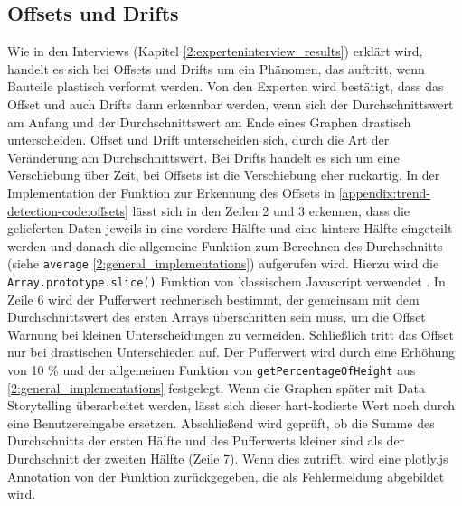 \subsection{Offsets und Drifts}
Wie in den Interviews (Kapitel \ref{2:experteninterview_results}) erklärt wird, handelt es sich bei Offsets und Drifts um ein Phänomen, das auftritt, wenn Bauteile plastisch verformt werden. Von den Experten wird bestätigt, dass das Offset und auch Drifts dann erkennbar werden, wenn sich der Durchschnittswert am Anfang und der Durchschnittswert am Ende eines Graphen drastisch unterscheiden. Offset und Drift unterscheiden sich, durch die Art der Veränderung am Durchschnittswert. Bei Drifts handelt es sich um eine Verschiebung über Zeit, bei Offsets ist die Verschiebung eher ruckartig. In der Implementation der Funktion zur Erkennung des Offsets in \ref{appendix:trend-detection-code:offsets} lässt sich in den Zeilen 2 und 3 erkennen, dass die gelieferten Daten jeweils in eine vordere Hälfte und eine hintere Hälfte eingeteilt werden und danach die allgemeine Funktion zum Berechnen des Durchschnitts (siehe \texttt{average} \ref{2:general_implementations}) aufgerufen wird. Hierzu wird die \texttt{Array.prototype.slice()} Funktion von klassischem Javascript verwendet \cite{MDNcontributors.2020}. In Zeile 6 wird der Pufferwert rechnerisch bestimmt, der gemeinsam mit dem Durchschnittswert des ersten Arrays überschritten  sein muss, um die Offset Warnung bei kleinen Unterscheidungen zu vermeiden. Schließlich tritt das Offset nur bei drastischen Unterschieden auf. Der Pufferwert wird durch eine Erhöhung von 10 \% und der allgemeinen Funktion von \texttt{getPercentageOfHeight} aus \ref{2:general_implementations} festgelegt. Wenn die Graphen später mit Data Storytelling überarbeitet werden, lässt sich dieser hart-kodierte Wert noch durch eine Benutzereingabe ersetzen. Abschließend wird geprüft, ob die Summe des Durchschnitts der ersten Hälfte und des Pufferwerts kleiner sind als der Durchschnitt der zweiten Hälfte (Zeile 7). Wenn dies zutrifft, wird eine plotly.js Annotation von der Funktion zurückgegeben, die als Fehlermeldung abgebildet wird.

